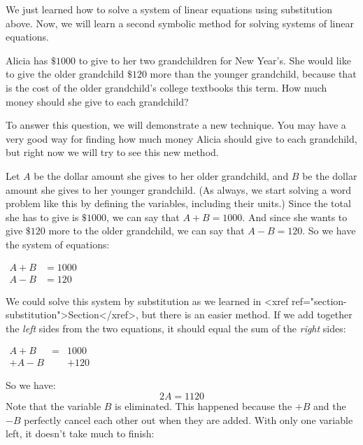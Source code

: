 \documentclass[nooutcomes]{ximera}
\begin{document}
 We just  learned how to solve a system of linear equations using substitution above. Now, 
      we will learn a second symbolic method for solving systems of linear equations.
\begin{example}
 Alicia has $\$1000$ to give to her two grandchildren for New Year's.
        She would like to give the older grandchild $\$120$ more than the younger grandchild,
        because that is the cost of the older grandchild's college textbooks this term.
        How much money should she give to each grandchild?

    To answer this question, we will demonstrate a new technique.
        You may have a very good way for finding how much money Alicia should give to each grandchild,
        but right now we will try to see this new method.

 Let $A$ be the dollar amount she gives to her older grandchild,
        and $B$ be the dollar amount she gives to her younger grandchild.
        (As always, we start solving a word problem like this by defining the variables,
        including their units.)
        Since the total she has to give is $\$1000$,
        we can say that $A+B=1000$.
        And since she wants to give $\$120$ more to the older grandchild,
        we can say that $A-B=120$.
        So we have the system of equations:
    \begin{center}
$
          \begin{aligned}
          A+B & = 1000 \\
          A-B & = 120
          \end{aligned}
$
\end{center}
 We could solve this system by substitution as we learned in <xref ref="section-substitution">Section</xref>,
        but there is an easier method.
        If we add together the \textit{left}
        sides from the two equations,
        it should equal the sum of the \textit{right} sides:
\begin{center}
$
           \begin{array}{rcl}
A+B &=&1000\\
+A-B & & +120
\end{array}
          $
\end{center}
So we have:
\[
          2A=1120
\]
Note that the variable $B$ is eliminated.
        This happened because the $+B$
        and the $-B$
        perfectly cancel each other out when they are added.
        With only one variable left, it doesn't take much to finish:
\begin{center}

\end{center}
\end{example}
\end{document}

